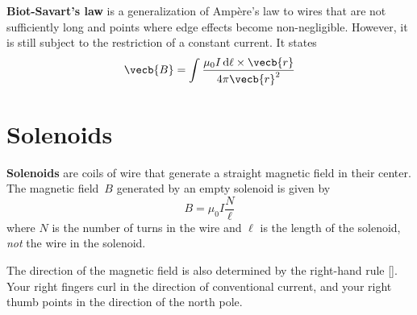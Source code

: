 \textbf{Biot-Savart's law} is a generalization of Ampère's law
to wires that are not sufficiently long
and points where edge effects become non-negligible.
However, it is still subject to the restriction of a constant current.
It states
\begin{equation}
    \vecb{B} = \int \frac{\mu_0 I \odif{\ell} \times \vecb{r}}{4 \pi \vecb{r}^2}
\end{equation}

\section{Solenoids}

\textbf{Solenoids} are coils of wire that generate a straight magnetic field
in their center.
The magnetic field~\(B\) generated by an empty solenoid is given by
\begin{equation}
    B = \mu_0 I \frac{N}{\ell}
\end{equation}
where \(N\) is the number of turns in the wire
and \(\ell\) is the length of the solenoid,
\emph{not} the wire in the solenoid.

The direction of the magnetic field is also determined
by the right-hand rule [].
Your right fingers curl in the direction of conventional current,
and your right thumb points in the direction of the north pole.
